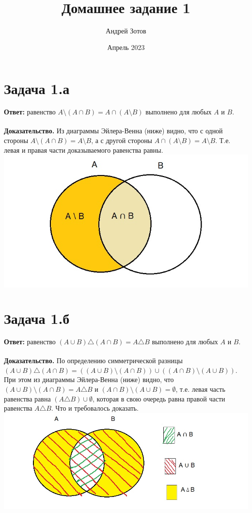 \documentclass{article}
\title{Домашнее задание 1}
\author{Андрей Зотов}
\date{Апрель 2023}
\begin{document}
\maketitle

\section*{Задача 1.а}
{\bf Ответ:} равенство $A\setminus (A\cap B)= A \cap(A \setminus B)$ выполнено для любых $A$ и $B$.
\\
\\
{\bf Доказательство.} Из диаграммы Эйлера-Венна (ниже) видно, что с одной стороны $A\setminus (A\cap B) = A\setminus B$, а с другой стороны $A \cap(A \setminus B) = A\setminus B$. Т.е. левая и правая части доказываемого равенства равны.
\\
{\includegraphics[scale=0.8]{img/img1.jpg}}
\section*{Задача 1.б}
{\bf Ответ:} равенство $(A\cup B)\triangle (A\cap B)= A \triangle B$ выполнено для любых $A$ и $B$.
\\
\\
{\bf Доказательство.} По определению симметрической разницы $(A\cup B)\triangle (A\cap B) = ((A\cup B)\setminus(A\cap B))\cup((A\cap B)\setminus (A\cup B))$. При этом из диаграммы Эйлера-Венна (ниже) видно, 
что $(A\cup B)\setminus(A\cap B) = A \triangle B$ и $(A\cap B)\setminus (A\cup B) =  \emptyset$, т.е. левая часть равенства равна $(A \triangle B) \cup  \emptyset$, которая в свою очередь равна правой части равенства $A \triangle B$. Что и требовалось доказать.
\\
{\includegraphics[scale=0.8]{img/img2.jpg}}
\end{document}
